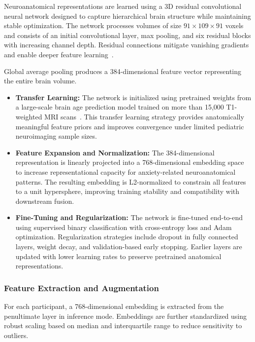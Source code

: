 \documentclass[10pt,letterpaper]{article}
\begin{document}
Neuroanatomical representations are learned using a 3D residual convolutional neural network designed to capture hierarchical brain structure while maintaining stable optimization. The network processes volumes of size $91 \times 109 \times 91$ voxels and consists of an initial convolutional layer, max pooling, and six residual blocks with increasing channel depth. Residual connections mitigate vanishing gradients and enable deeper feature learning~\cite{ref63}.

Global average pooling produces a 384-dimensional feature vector representing the entire brain volume.

\begin{itemize}
    \item \textbf{Transfer Learning:} The network is initialized using pretrained weights from a large-scale brain age prediction model trained on more than 15,000 T1-weighted MRI scans~\cite{ref64}. This transfer learning strategy provides anatomically meaningful feature priors and improves convergence under limited pediatric neuroimaging sample sizes.
    \item \textbf{Feature Expansion and Normalization:} The 384-dimensional representation is linearly projected into a 768-dimensional embedding space to increase representational capacity for anxiety-related neuroanatomical patterns. The resulting embedding is L2-normalized to constrain all features to a unit hypersphere, improving training stability and compatibility with downstream fusion.
    \item \textbf{Fine-Tuning and Regularization:} The network is fine-tuned end-to-end using supervised binary classification with cross-entropy loss and Adam optimization. Regularization strategies include dropout in fully connected layers, weight decay, and validation-based early stopping. Earlier layers are updated with lower learning rates to preserve pretrained anatomical representations.
\end{itemize}

\subsubsection*{\textbf{Feature Extraction and Augmentation}}

For each participant, a 768-dimensional embedding is extracted from the penultimate layer in inference mode. Embeddings are further standardized using robust scaling based on median and interquartile range to reduce sensitivity to outliers.
\end{document}
